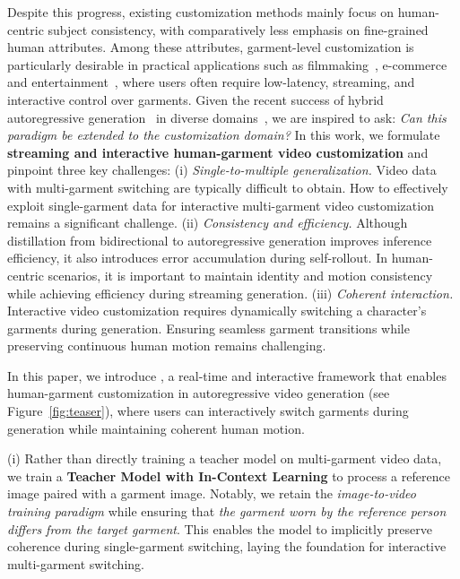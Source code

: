 Despite this progress, existing customization methods mainly focus on human-centric subject consistency, with comparatively less emphasis on fine-grained human attributes.
Among these attributes, garment-level customization is particularly desirable in practical applications such as filmmaking~\cite{wang2024motionctrl,song2025lightmotion}, e-commerce~\cite{lari2022artifical} and entertainment~\cite{li2023photomaker,song2025univst,zhang2025objectadd}, where users often require low-latency, streaming, and interactive control over garments.
% 
Given the recent success of hybrid autoregressive generation~\cite{yin2025slow,huang2025self,zhu2026causal} in diverse domains~\cite{zhuang2025flashvsr,huang2025live,shin2025motionstream}, we are inspired to ask: \textit{Can this paradigm be extended to the customization domain?}
% 
In this work, we formulate \textbf{streaming and interactive human-garment video customization} and pinpoint three key challenges:
%
(i) \textit{Single-to-multiple generalization.}
Video data with multi-garment switching are typically difficult to obtain. How to effectively exploit single-garment data for interactive multi-garment video customization remains a significant challenge.
%
(ii) \textit{Consistency and efficiency.}
%
Although distillation from bidirectional to autoregressive generation improves inference efficiency, it also introduces error accumulation during self-rollout.
In human-centric scenarios, it is important to maintain identity and motion consistency while achieving efficiency during streaming generation.
% 
(iii) \textit{Coherent interaction.}
% 
Interactive video customization requires dynamically switching a character's garments during generation.
Ensuring seamless garment transitions while preserving continuous human motion remains challenging.





In this paper, we introduce \textbf{\method}, a real-time and interactive framework that enables human-garment customization in autoregressive video generation (see Figure~\ref{fig:teaser}), where users can interactively switch garments during generation while maintaining coherent human motion.





(i) Rather than directly training a teacher model on multi-garment video data, we train a \textbf{Teacher Model with In-Context Learning} to process a reference image paired with a garment image.
Notably, we retain the \textit{image-to-video training paradigm} while ensuring that \textit{the garment worn by the reference person differs from the target garment}.
This enables the model to implicitly preserve coherence during single-garment switching, laying the foundation for interactive multi-garment switching.





